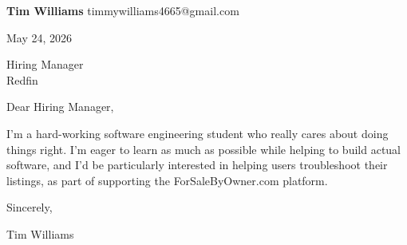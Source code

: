 \documentclass[12pt]{article}
\begin{document}
\textbf{Tim Williams} \hfill timmywilliams4665@gmail.com

\vspace{1em}

May 24, 2026

\vspace{1em}

Hiring Manager \\
Redfin

\vspace{1em}

Dear Hiring Manager,

I'm a hard-working software engineering student who really cares about doing things right. I'm eager to learn as much as possible while helping to build actual software, and I'd be particularly interested in helping users troubleshoot their listings, as part of supporting the ForSaleByOwner.com platform.

\vspace{1em}

Sincerely,

\vspace{2em}

Tim Williams
\end{document}
